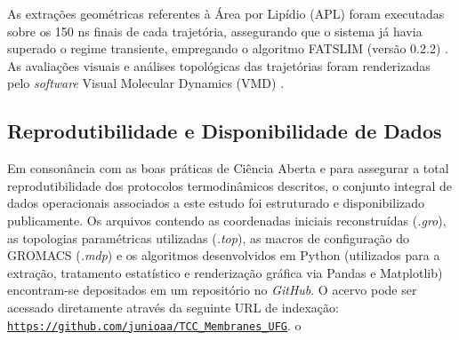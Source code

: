 As extrações geométricas referentes à Área por Lipídio (APL) foram executadas sobre os 150 ns finais de cada trajetória, assegurando que o sistema já havia superado o regime transiente, empregando o algoritmo FATSLIM (versão 0.2.2) \cite{buchoux2017fatslim}. As avaliações visuais e análises topológicas das trajetórias foram renderizadas pelo \textit{software} Visual Molecular Dynamics (VMD) \cite{vmd2024}.

\subsection{Reprodutibilidade e Disponibilidade de Dados}

Em consonância com as boas práticas de Ciência Aberta e para assegurar a total reprodutibilidade dos protocolos termodinâmicos descritos, o conjunto integral de dados operacionais associados a este estudo foi estruturado e disponibilizado publicamente. Os arquivos contendo as coordenadas iniciais reconstruídas (\textit{.gro}), as topologias paramétricas utilizadas (\textit{.top}), as macros de configuração do GROMACS (\textit{.mdp}) e os algoritmos desenvolvidos em Python (utilizados para a extração, tratamento estatístico e renderização gráfica via Pandas e Matplotlib) encontram-se depositados em um repositório no \textit{GitHub}. O acervo pode ser acessado diretamente através da seguinte URL de indexação: \texttt{\url{https://github.com/junioaa/TCC_Membranes_UFG}}.
o
